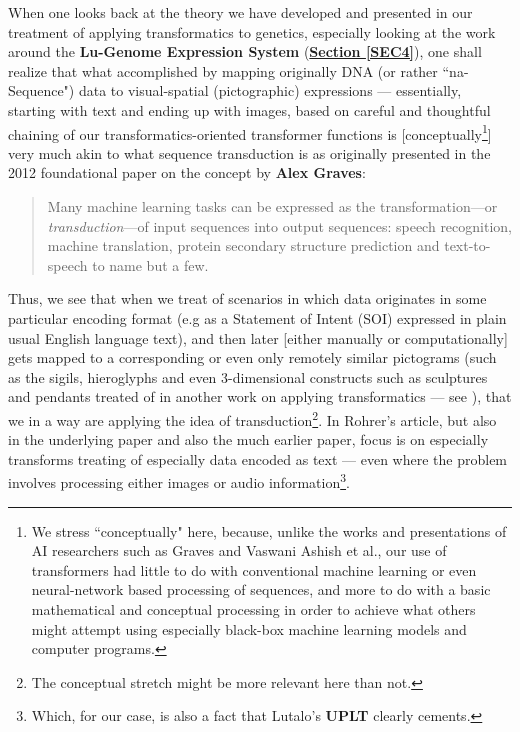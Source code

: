 \documentclass[a4paper, 18pt]{book} %
\begin{document}
\begin{appendices}
When one looks back at the theory we have developed and presented in our treatment of applying transformatics to genetics\cite{lutalo_2025_trans_genetics}, especially looking at the work around the \textbf{Lu-Genome Expression System} (\textbf{\hyperref[SEC4]{Section \ref{SEC4}}}), one shall realize that what accomplished by mapping originally DNA (or rather ``na-Sequence") data to visual-spatial (pictographic) expressions --- essentially, starting with text and ending up with images, based on careful and thoughtful chaining of our transformatics-oriented transformer functions is [conceptually\footnote{We stress ``conceptually" here, because, unlike the works and presentations of AI researchers such as Graves\cite{Graves2012} and  Vaswani Ashish et al.\cite{Vaswani2017}, our use of transformers had little to do with conventional machine learning or even neural-network based processing of sequences, and more to do with a basic mathematical and conceptual processing in order to achieve what others might attempt using especially black-box machine learning models and computer programs.}] very much akin to what sequence transduction is as originally presented in the 2012 foundational paper on the concept by \textbf{Alex Graves}\cite{Graves2012}:\\


\noindent
\begin{minipage}{1\textwidth}
\vspace{1em}
\begin{quotation}
{\ttfamily

Many machine learning tasks can be expressed as the transformation---or \textit{transduction}---of input sequences into output sequences: speech recognition, machine translation, protein secondary structure prediction and text-to-speech to name but a few.

}
\end{quotation}
\vspace{1em}
\end{minipage}

\vspace{2em}



Thus, we see that when we treat of scenarios in which data originates in some particular encoding format (e.g as a Statement of Intent (SOI) expressed in plain usual English language text), and then later [either manually or computationally] gets mapped to a corresponding or even only remotely similar pictograms (such as the sigils, hieroglyphs and even 3-dimensional constructs such as sculptures and pendants treated of in another work on applying transformatics --- see \cite{lutalo_2025_grimlumtauto}), that we in a way are applying the idea of transduction\footnote{The conceptual stretch might be more relevant here than not.}. In Rohrer's article\cite{Rohrer2020}, but also in the underlying paper\cite{Vaswani2017} and also the much earlier paper\cite{Graves2012}, focus is on especially transforms treating of especially data encoded as text --- even where the problem involves processing either images or audio information\footnote{Which, for our case, is also a fact that Lutalo's \textbf{UPLT}\cite{lutalo2024software} clearly cements.}. 



\end{appendices}
\end{document}
